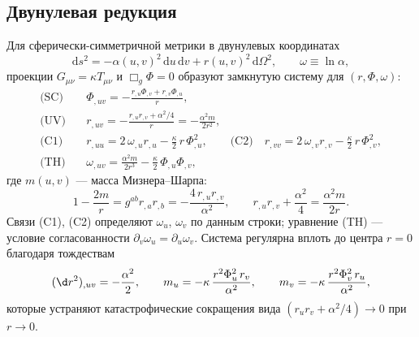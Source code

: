 \documentclass[11pt,a4paper]{article}
\newcommand{\dd}{\mathrm{d}}
\begin{document}
\subsection{Двунулевая редукция}
Для сферически-симметричной метрики в двунулевых координатах
\begin{equation}
\dd s^2=-\alpha(u,v)^2\,\dd u\,\dd v+r(u,v)^2\,\dd\Omega^2,
\qquad \omega\equiv\ln\alpha,
\label{eq:metric}
\end{equation}
проекции $G_{\mu\nu}=\kappa T_{\mu\nu}$ и $\Box_g\Phi=0$ образуют замкнутую
систему для $(r,\Phi,\omega)$:
\begin{align}
\text{(SC)}\quad & \Phi_{,uv}=-\frac{r_{,u}\Phi_{,v}+r_{,v}\Phi_{,u}}{r},
\label{eq:sc}\\
\text{(UV)}\quad & r_{,uv}=-\frac{r_{,u}r_{,v}+\alpha^2/4}{r}
= -\frac{\alpha^2 m}{2r^2},\label{eq:uv}\\
\text{(C1)}\quad & r_{,uu}=2\,\omega_{,u}r_{,u}-\frac{\kappa}{2}\,r\,\Phi_{,u}^2,
\qquad
\text{(C2)}\quad r_{,vv}=2\,\omega_{,v}r_{,v}-\frac{\kappa}{2}\,r\,\Phi_{,v}^2,
\label{eq:c1c2}\\
\text{(TH)}\quad & \omega_{,uv}=\frac{\alpha^2 m}{2r^3}
-\frac{\kappa}{2}\,\Phi_{,u}\Phi_{,v},\label{eq:th}
\end{align}
где $m(u,v)$ --- масса Мизнера--Шарпа:
\begin{equation}
1-\frac{2m}{r}=g^{ab}r_{,a}r_{,b}=-\frac{4\,r_{,u}r_{,v}}{\alpha^2},
\qquad r_{,u}r_{,v}+\frac{\alpha^2}{4}=\frac{\alpha^2 m}{2r}.
\label{eq:misner}
\end{equation}
Связи (C1), (C2) определяют $\omega_u$, $\omega_v$ по данным строки;
уравнение (TH) --- условие согласованности $\partial_v\omega_u=\partial_u\omega_v$.
Система регулярна вплоть до центра $r=0$ благодаря тождествам
\begin{equation}
(\d r^2)_{,uv}=-\frac{\alpha^2}{2},\qquad
m_u=-\kappa\,\frac{r^2\Phi_u^2\,r_v}{\alpha^2},\qquad
m_v=-\kappa\,\frac{r^2\Phi_v^2\,r_u}{\alpha^2},
\label{eq:identities}
\end{equation}
которые устраняют катастрофические сокращения вида
$(r_ur_v+\alpha^2/4)\to0$ при $r\to0$.
\end{document}
